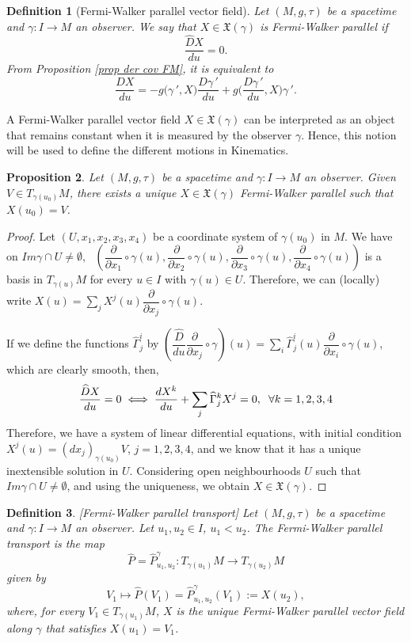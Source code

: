 \documentclass[11pt]{book}
\newtheorem{defi}{Definition}[chapter]
\newtheorem{pro}[defi]{Proposition}
\def\x{\mathfrak X}
\begin{document}
\begin{defi}[Fermi-Walker parallel vector field]
	Let $(M,g,\tau)$ be a spacetime and $\gamma:I\to M$ an observer. We say that $X\in\x(\gamma)$ is Fermi-Walker parallel if $$\frac{\widehat{D}X}{du}=0.$$
 From Proposition \ref{prop der cov FM}, it is equivalent to 
 \begin{equation}
  \frac{DX}{du}=-g\big(\gamma{\,'},X\big)\frac{D\gamma{\,'}}{du}+g\Big(\frac{D\gamma{\,'}}{du},X\Big)\gamma{\,'}. 
\end{equation}
\end{defi}
A Fermi-Walker parallel vector field $X\in\x(\gamma)$ can be interpreted as an object that remains constant when it is measured by the observer $\gamma$. Hence, this notion will be used to define the different motions in Kinematics.

\begin{pro}
	Let $(M,g,\tau)$ be a spacetime and $\gamma:I\to M$ an observer. Given $V\in T_{\gamma(u_0)}M$, there exists a unique $X\in \x(\gamma)$ Fermi-Walker parallel such that $X(u_0)=V$.
\end{pro}
\begin{proof}
	Let $(U,x_1,x_2,x_3,x_4)$ be a coordinate system of $\gamma(u_0)$ in $M$. We have on $Im\gamma \cap U\ne \emptyset$, \, $\left(\dfrac{\partial}{\partial x_1}\circ \gamma(u),\dfrac{\partial}{\partial x_2}\circ \gamma(u),\dfrac{\partial}{\partial x_3}\circ \gamma(u),\dfrac{\partial}{\partial x_4}\circ \gamma(u)\right)$ is a basis in $T_{\gamma(u)}M$ for every $u\in I$ with $\gamma(u)\in U$. Therefore, we can (locally) write $X(u)=\sum_j X^j(u) \dfrac{\partial}{\partial x_j}\circ \gamma(u)$.
	
	If we define the functions $\widehat{\Gamma}^i_j$ by $\left(\dfrac{\widehat{D}}{du}\dfrac{\partial}{\partial x_j}\circ \gamma \right)(u)=\sum_i \widehat{\Gamma}^i_j(u) \dfrac{\partial}{\partial x_i}\circ \gamma(u)$, which are clearly smooth, then, 
	\[
	\frac{\widehat{D}X}{du}=0 \iff \frac{dX^k}{du} + \sum_j \widehat{\Gamma}^k_j X^j=0,\hspace{2mm} \forall k=1,2,3,4
	\]
	Therefore, we have a system of linear differential equations, with initial condition $X^j(u)=(dx_j)_{\gamma(u_0)}V$, $j=1,2,3,4$, and we know that it has a unique inextensible solution in $U$. Considering open neighbourhoods $U$ such that $Im\gamma \cap U\ne \emptyset$, and using the uniqueness, we obtain $X\in \x(\gamma)$.
\end{proof}

\begin{defi}\label{FW parallel transport}[Fermi-Walker parallel transport]
	Let $(M,g,\tau)$ be a spacetime and $\gamma:I\to M$ an observer. Let $u_1,u_2\in I$, $u_1<u_2$. The Fermi-Walker parallel transport is the map
	\[
	\widehat{P}=\widehat{P}_{u_1,u_2}^\gamma : T_{\gamma(u_1)}M \to T_{\gamma(u_2)}M
	\]
	given by
	\[
	V_1 \longmapsto \widehat{P}(V_1)=\widehat{P}_{u_1,u_2}^\gamma(V_1):=X(u_2),
	\]
	where, for every $V_1\in T_{\gamma(u_1)}M$, $X$ is the unique Fermi-Walker parallel vector field along $\gamma$ that satisfies $X(u_1)=V_1$. 
\end{defi}
\end{document}
